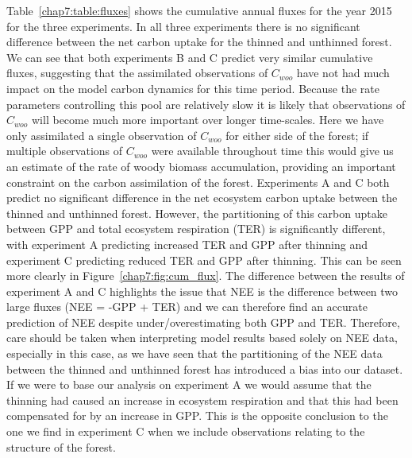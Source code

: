 Table~\ref{chap7:table:fluxes} shows the cumulative annual fluxes for the year 2015 for the three experiments. In all three experiments there is no significant difference between the net carbon uptake for the thinned and unthinned forest. We can see that both experiments B and C predict very similar cumulative fluxes, suggesting that the assimilated observations of \(C_{woo}\) have not had much impact on the model carbon dynamics for this time period. Because the rate parameters controlling this pool are relatively slow it is likely that observations of \(C_{woo}\) will become much more important over longer time-scales. Here we have only assimilated a single observation of \(C_{woo}\) for either side of the forest; if multiple observations of \(C_{woo}\) were available throughout time this would give us an estimate of the rate of woody biomass accumulation, providing an important constraint on the carbon assimilation of the forest. Experiments A and C both predict no significant difference in the net ecosystem carbon uptake between the thinned and unthinned forest. However, the partitioning of this carbon uptake between GPP and total ecosystem respiration (TER) is significantly different, with experiment A predicting increased TER and GPP after thinning and experiment C predicting reduced TER and GPP after thinning. This can be seen more clearly in Figure~\ref{chap7:fig:cum_flux}. The difference between the results of experiment A and C highlights the issue that NEE is the difference between two large fluxes (NEE = -GPP + TER) and we can therefore find an accurate prediction of NEE despite under/overestimating both GPP and TER. Therefore, care should be taken when interpreting model results based solely on NEE data, especially in this case, as we have seen that the partitioning of the NEE data between the thinned and unthinned forest has introduced a bias into our dataset. If we were to base our analysis on experiment A we would assume that the thinning had caused an increase in ecosystem respiration and that this had been compensated for by an increase in GPP. This is the opposite conclusion to the one we find in experiment C when we include observations relating to the structure of the forest. 

